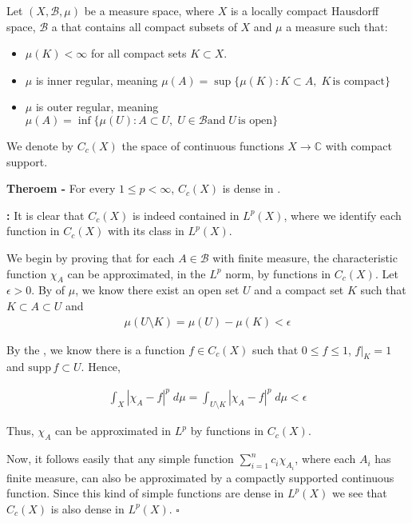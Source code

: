 \documentclass[12pt]{article}
\begin{document}
Let $(X, \mathcal{B}, \mu)$ be a measure space, where $X$ is a locally compact Hausdorff space, $\mathcal{B}$ a  that contains all compact subsets of $X$ and $\mu$ a measure such that:

\begin{itemize}
\item $\mu(K) < \infty$ for all compact sets $K \subset X$.
\item $\mu$ is inner regular, meaning $\mu(A) = \sup\{ \mu(K) : K \subset A, \; K\,\text{is compact}\}$
\item $\mu$ is outer regular, meaning $\mu(A) = \inf\{ \mu(U) : A \subset U,\; U \in \mathcal{B} \text{and}\; U\,\text{is open}\}$
\end{itemize}

We denote by $C_c(X)$ the space of continuous functions $X \to \mathbb{C}$ with compact support.

{\bf Theroem -} For every $1 \leq p < \infty$, $C_c(X)$ is dense in .

{\bf \emph{}:} It is clear that $C_c(X)$ is indeed contained in $L^p(X)$, where we identify each function in $C_c(X)$ with its class in $L^p(X)$.

We begin by proving that for each $A \in \mathcal{B}$ with finite measure, the characteristic function $\chi_A$ can be approximated, in the $L^p$ norm, by functions in $C_c(X)$. Let $\epsilon > 0$. By  of $\mu$, we know there exist an open set $U$ and a compact set $K$ such that $K \subset A \subset U$ and
\begin{align*}
\mu(U \setminus K) = \mu(U) - \mu(K) < \epsilon
\end{align*}

By the , we know there is a function $f \in C_c(X)$ such that $0 \leq f \leq 1$, $f|_K = 1$ and $\mathrm{supp}\,f \subset U$. Hence,

\begin{align*}
\int_X |\chi_A - f|^p \;d\mu = \int_{U \setminus K} |\chi_A - f|^p \;d\mu < \epsilon
\end{align*}

Thus, $\chi_A$ can be approximated in $L^p$ by functions in $C_c(X)$.

Now, it follows easily that any simple function $\sum_{i=1}^n c_i \chi_{A_i}$, where each $A_i$ has finite measure, can also be approximated by a compactly supported continuous function. Since this kind of simple functions are dense in $L^p(X)$ we see that $C_c(X)$ is also dense in $L^p(X)$. $\square$
\end{document}
